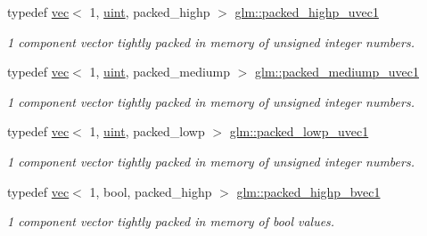 \begin{DoxyCompactItemize}
\mbox{\label{group__gtc__type__aligned_ga160352f526bef94d143ccb525095936e}} 
typedef \hyperlink{structglm_1_1vec}{vec}$<$ 1, \hyperlink{group__core__precision_ga4fd29415871152bfb5abd588334147c8}{uint}, packed\+\_\+highp $>$ \hyperlink{group__gtc__type__aligned_ga160352f526bef94d143ccb525095936e}{glm\+::packed\+\_\+highp\+\_\+uvec1}
\begin{DoxyCompactList}\small\item\em 1 component vector tightly packed in memory of unsigned integer numbers. \end{DoxyCompactList}\item 
\mbox{\label{group__gtc__type__aligned_ga2fd382e54fcf213b330d448f83738636}} 
typedef \hyperlink{structglm_1_1vec}{vec}$<$ 1, \hyperlink{group__core__precision_ga4fd29415871152bfb5abd588334147c8}{uint}, packed\+\_\+mediump $>$ \hyperlink{group__gtc__type__aligned_ga2fd382e54fcf213b330d448f83738636}{glm\+::packed\+\_\+mediump\+\_\+uvec1}
\begin{DoxyCompactList}\small\item\em 1 component vector tightly packed in memory of unsigned integer numbers. \end{DoxyCompactList}\item 
\mbox{\label{group__gtc__type__aligned_ga992b281fc2e3bf15c09f491393045ebc}} 
typedef \hyperlink{structglm_1_1vec}{vec}$<$ 1, \hyperlink{group__core__precision_ga4fd29415871152bfb5abd588334147c8}{uint}, packed\+\_\+lowp $>$ \hyperlink{group__gtc__type__aligned_ga992b281fc2e3bf15c09f491393045ebc}{glm\+::packed\+\_\+lowp\+\_\+uvec1}
\begin{DoxyCompactList}\small\item\em 1 component vector tightly packed in memory of unsigned integer numbers. \end{DoxyCompactList}\item 
\mbox{\label{group__gtc__type__aligned_ga00ef8acfca23dca78e1baa65bb5861ac}} 
typedef \hyperlink{structglm_1_1vec}{vec}$<$ 1, bool, packed\+\_\+highp $>$ \hyperlink{group__gtc__type__aligned_ga00ef8acfca23dca78e1baa65bb5861ac}{glm\+::packed\+\_\+highp\+\_\+bvec1}
\begin{DoxyCompactList}\small\item\em 1 component vector tightly packed in memory of bool values. \end{DoxyCompactList}\item 

\end{DoxyCompactItemize}
